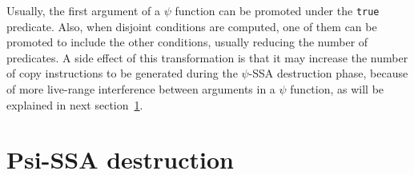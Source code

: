 \begin{itemize}




Usually, the first argument of a $\psi$ function can be promoted
under the {\tt true} predicate. Also, when disjoint conditions are
computed, one of them can be promoted to include the other conditions,
usually reducing the number of predicates. A side effect of this
transformation is that it may increase the number of copy instructions
to be generated during the $\psi$-SSA destruction phase, because of
more live-range interference between arguments in a $\psi$ function,
as will be explained in next section~\ref{sec:Psi_ssa_destruction}.

\end{itemize}

\section{Psi-SSA destruction}
\label{sec:Psi_ssa_destruction}

